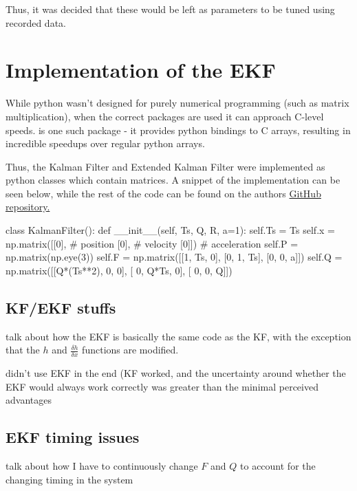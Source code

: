Thus, it was decided that these would be left as parameters to be tuned using recorded data.

\section{Implementation of the EKF}

While python wasn't designed for purely numerical programming (such as matrix multiplication), when the correct packages are used it can approach C-level speeds.  is one such package - it provides python bindings to C arrays, resulting in incredible speedups over regular python arrays.

Thus, the Kalman Filter and Extended Kalman Filter were implemented as python classes which contain  matrices. A snippet of the implementation can be seen below, while the rest of the code can be found on the authors \href{https://github.com/alknemeyer/EEE4022S-Thesis-Project/blob/master/Final%20code/extended_kalman_filter.ipynb}{GitHub repository.} \\

\begin{python}
class KalmanFilter():
    def __init__(self, Ts, Q, R, a=1):
        self.Ts = Ts
        self.x = np.matrix([[0],  # position
                            [0],  # velocity
                            [0]]) # acceleration
        self.P = np.matrix(np.eye(3))
        self.F = np.matrix([[1, Ts,  0],
                            [0,  1, Ts],
                            [0,  0,  a]])
        self.Q = np.matrix([[Q*(Ts**2),    0, 0],
                            [        0, Q*Ts, 0],
                            [        0,    0, Q]])
\end{python}

\subsection{KF/EKF stuffs}
{\Large \color{red} talk about how the EKF is basically the same code as the KF, with the exception that the $h$ and $\frac{\delta h}{\delta x}$ functions are modified.}

{\Huge \color{red} didn't use EKF in the end (KF worked, and the uncertainty around whether the EKF would always work correctly was greater than the minimal perceived advantages}

\subsection{EKF timing issues}
{\Large \color{red} talk about how I have to continuously change $F$ and $Q$ to account for the changing timing in the system}

